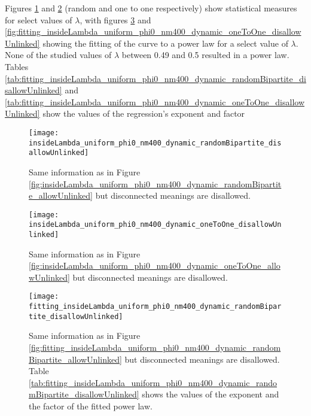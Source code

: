 Figures \ref{fig:insideLambda_uniform_phi0_nm400_dynamic_randomBipartite_disallowUnlinked} and \ref{fig:insideLambda_uniform_phi0_nm400_dynamic_oneToOne_disallowUnlinked} (random and one to one respectively) show statistical measures for select values of $\lambda$, with figures \ref{fig:fitting_insideLambda_uniform_phi0_nm400_dynamic_randomBipartite_disallowUnlinked} and \ref{fig:fitting_insideLambda_uniform_phi0_nm400_dynamic_oneToOne_disallowUnlinked} showing the fitting of the curve to a power law for a select value of $\lambda$.
None of the studied values of $\lambda$ between 0.49 and 0.5 resulted in a power law.
Tables \ref{tab:fitting_insideLambda_uniform_phi0_nm400_dynamic_randomBipartite_disallowUnlinked} and \ref{tab:fitting_insideLambda_uniform_phi0_nm400_dynamic_oneToOne_disallowUnlinked} show the values of the regression's exponent and factor

\begin{figure}
  \centering
  \texttt{[image: insideLambda\_uniform\_phi0\_nm400\_dynamic\_randomBipartite\_disallowUnlinked]}
  \caption{Same information as in Figure \ref{fig:insideLambda_uniform_phi0_nm400_dynamic_randomBipartite_allowUnlinked} but disconnected meanings are disallowed.}
  \label{fig:insideLambda_uniform_phi0_nm400_dynamic_randomBipartite_disallowUnlinked}
\end{figure}

\begin{figure}
  \centering
  \texttt{[image: insideLambda\_uniform\_phi0\_nm400\_dynamic\_oneToOne\_disallowUnlinked]}
  \caption{Same information as in Figure \ref{fig:insideLambda_uniform_phi0_nm400_dynamic_oneToOne_allowUnlinked} but disconnected meanings are disallowed.}
  \label{fig:insideLambda_uniform_phi0_nm400_dynamic_oneToOne_disallowUnlinked}
\end{figure}

\begin{figure}
  \centering
  \texttt{[image: fitting\_insideLambda\_uniform\_phi0\_nm400\_dynamic\_randomBipartite\_disallowUnlinked]}
  \caption{Same information as in Figure \ref{fig:fitting_insideLambda_uniform_phi0_nm400_dynamic_randomBipartite_allowUnlinked} but disconnected meanings are disallowed.
Table \ref{tab:fitting_insideLambda_uniform_phi0_nm400_dynamic_randomBipartite_disallowUnlinked} shows the values of the exponent and the factor of the fitted power law.}
  \label{fig:fitting_insideLambda_uniform_phi0_nm400_dynamic_randomBipartite_disallowUnlinked}
\end{figure}

